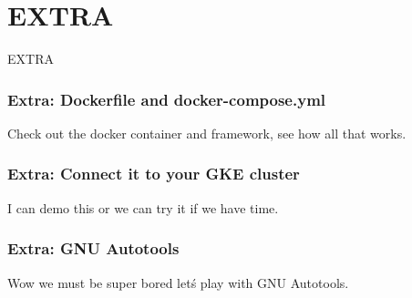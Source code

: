 \documentclass[aspectratio=169]{beamer}
\begin{document}
\section{EXTRA}
\begin{frame}
	\Huge \textcolor{dgreen}{EXTRA}
\end{frame}


\begin{frame}
	\frametitle{Extra: Dockerfile and docker-compose.yml}

	Check out the docker container and framework, see how all that works.

\end{frame}


\begin{frame}
	\frametitle{Extra: Connect it to your GKE cluster}

	I can demo this or we can try it if we have time.

\end{frame}

\begin{frame}
	\frametitle{Extra: GNU Autotools}

	Wow we must be super bored let\'s play with GNU Autotools.

\end{frame}
\end{document}
